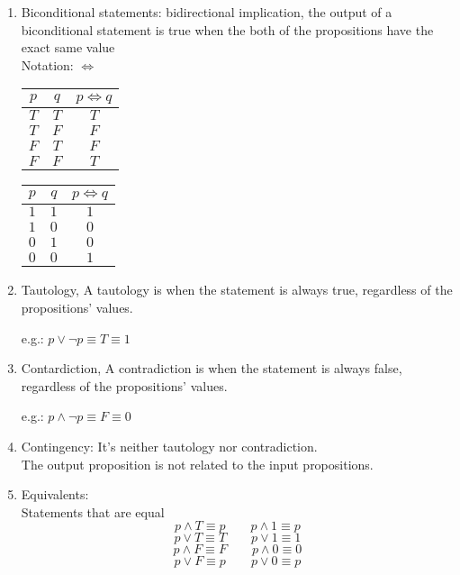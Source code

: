 \documentclass{article}
\begin{document}
\begin{enumerate}[label=Def. \arabic*:, leftmargin=3.5em, align=left]
  \newpage

  \item Biconditional statements: bidirectional implication, the output of a biconditional statement is true when the both of the propositions have the exact same value\\
  Notation: $\Leftrightarrow$
  \begin{center}
    \begin{tabular}{cc|c}
      $p$ & $q$ & $p \Leftrightarrow q$ \\ \hline 
      $T$ & $T$ & $T$ \\
      $T$ & $F$ & $F$ \\
      $F$ & $T$ & $F$ \\
      $F$ & $F$ & $T$ \\
    \end{tabular} \qquad
    \begin{tabular}{cc|c}
      $p$ & $q$ & $p \Leftrightarrow q$ \\ \hline 
      $1$ & $1$ & $1$ \\
      $1$ & $0$ & $0$ \\
      $0$ & $1$ & $0$ \\
      $0$ & $0$ & $1$ \\
    \end{tabular}
  \end{center}

  \item Tautology, A tautology is when the statement is always true, regardless of the propositions' values.
  \begin{center}
    e.g.: $p \vee \neg p \equiv T \equiv 1$
  \end{center}

  \item Contardiction, A contradiction is when the statement is always false, regardless of the propositions' values.
  \begin{center}
    e.g.: $p \wedge \neg p \equiv F \equiv 0$
  \end{center}

  \item Contingency:
  It's neither tautology nor contradiction.\\
  The output proposition is not related to the input propositions.
  
  \item Equivalents:\\
  Statements that are equal
  $$p \wedge T \equiv p \qquad p \wedge 1 \equiv p$$
  $$p \vee T \equiv T \qquad p \vee 1 \equiv 1$$
  $$p \wedge F \equiv F \qquad p \wedge 0 \equiv 0$$
  $$p \vee F \equiv p \qquad p \vee 0 \equiv p$$
\end{enumerate}
\end{document}
